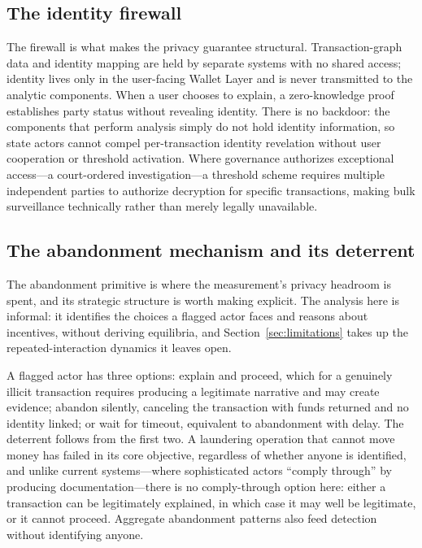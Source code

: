 \documentclass[11pt]{article}
\begin{document}
\subsection{The identity firewall}

The firewall is what makes the privacy guarantee structural. Transaction-graph data and identity
mapping are held by separate systems with no shared access; identity lives only in the user-facing
Wallet Layer and is never transmitted to the analytic components. When a user chooses to explain, a
zero-knowledge proof establishes party status without revealing identity. There is no backdoor: the
components that perform analysis simply do not hold identity information, so state actors cannot
compel per-transaction identity revelation without user cooperation or threshold activation. Where
governance authorizes exceptional access---a court-ordered investigation---a threshold scheme requires
multiple independent parties to authorize decryption for specific transactions, making bulk
surveillance technically rather than merely legally unavailable.

\subsection{The abandonment mechanism and its deterrent}

The abandonment primitive is where the measurement's privacy headroom is spent, and its strategic
structure is worth making explicit. The analysis here is informal: it identifies the choices a flagged
actor faces and reasons about incentives, without deriving equilibria, and Section~\ref{sec:limitations}
takes up the repeated-interaction dynamics it leaves open.

A flagged actor has three options: explain and proceed, which for a genuinely illicit transaction
requires producing a legitimate narrative and may create evidence; abandon silently, canceling the
transaction with funds returned and no identity linked; or wait for timeout, equivalent to
abandonment with delay. The deterrent follows from the first two. A laundering operation that cannot
move money has failed in its core objective, regardless of whether anyone is identified, and unlike
current systems---where sophisticated actors ``comply through'' by producing documentation---there is
no comply-through option here: either a transaction can be legitimately explained, in which case it
may well be legitimate, or it cannot proceed. Aggregate abandonment patterns also feed detection
without identifying anyone.
\end{document}
